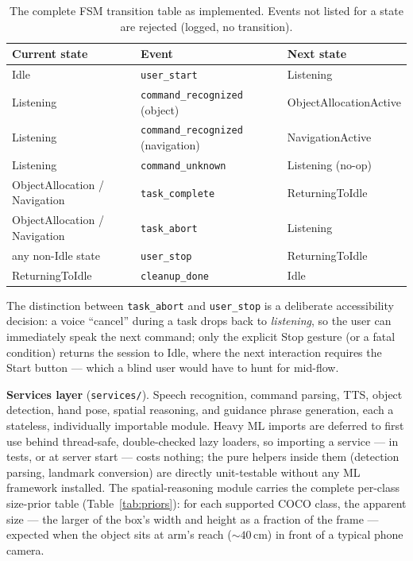 \begin{table}[!htbp]
\centering
\caption[FSM transition table]{The complete FSM transition table as implemented.
Events not listed for a state are rejected (logged, no transition).}
\label{tab:fsm_transitions}
\small
\begin{tabular}{p{3.9cm} p{4.8cm} p{4.2cm}}
\toprule
\textbf{Current state} & \textbf{Event} & \textbf{Next state} \\
\midrule
Idle & \texttt{user\_start} & Listening \\
Listening & \texttt{command\_recognized} (object) & ObjectAllocationActive \\
Listening & \texttt{command\_recognized} (navigation) & NavigationActive \\
Listening & \texttt{command\_unknown} & Listening (no-op) \\
ObjectAllocation / Navigation & \texttt{task\_complete} & ReturningToIdle \\
ObjectAllocation / Navigation & \texttt{task\_abort} & Listening \\
any non-Idle state & \texttt{user\_stop} & ReturningToIdle \\
ReturningToIdle & \texttt{cleanup\_done} & Idle \\
\bottomrule
\end{tabular}
\end{table}

The distinction between \texttt{task\_abort} and \texttt{user\_stop} is a
deliberate accessibility decision: a voice ``cancel'' during a task drops back to
\emph{listening}, so the user can immediately speak the next command; only the
explicit Stop gesture (or a fatal condition) returns the session to Idle, where
the next interaction requires the Start button --- which a blind user would have
to hunt for mid-flow.

\textbf{Services layer} (\texttt{services/}). Speech recognition, command parsing,
TTS, object detection, hand pose, spatial reasoning, and guidance phrase
generation, each a stateless, individually importable module. Heavy ML imports are
deferred to first use behind thread-safe, double-checked lazy loaders, so
importing a service --- in tests, or at server start --- costs nothing; the pure
helpers inside them (detection parsing, landmark conversion) are directly
unit-testable without any ML framework installed. The spatial-reasoning module
carries the complete per-class size-prior table (Table~\ref{tab:priors}): for
each supported COCO class, the apparent size --- the larger of the box's width and
height as a fraction of the frame --- expected when the object sits at arm's reach
(${\sim}40$\,cm) in front of a typical phone camera.

